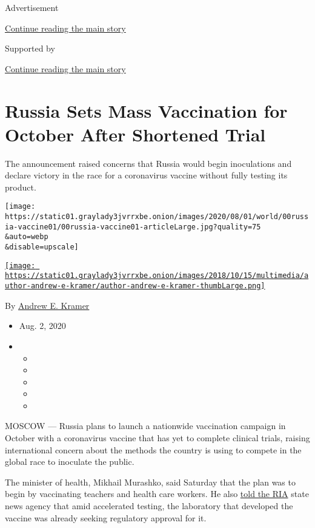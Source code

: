 Advertisement

\protect\hyperlink{after-top}{Continue reading the main story}

Supported by

\protect\hyperlink{after-sponsor}{Continue reading the main story}

\hypertarget{russia-sets-mass-vaccination-for-october-after-shortened-trial}{%
\section{Russia Sets Mass Vaccination for October After Shortened
Trial}\label{russia-sets-mass-vaccination-for-october-after-shortened-trial}}

The announcement raised concerns that Russia would begin inoculations
and declare victory in the race for a coronavirus vaccine without fully
testing its product.

\texttt{[image: https://static01.graylady3jvrrxbe.onion/images/2020/08/01/world/00russia-vaccine01/00russia-vaccine01-articleLarge.jpg?quality=75\\\&auto=webp\\\&disable=upscale]}

\href{https://www.nytimes3xbfgragh.onion/by/andrew-e-kramer}{\texttt{[image: https://static01.graylady3jvrrxbe.onion/images/2018/10/15/multimedia/author-andrew-e-kramer/author-andrew-e-kramer-thumbLarge.png]}}

By \href{https://www.nytimes3xbfgragh.onion/by/andrew-e-kramer}{Andrew
E. Kramer}

\begin{itemize}
\item
  Aug. 2, 2020
\item
  \begin{itemize}
  \item
  \item
  \item
  \item
  \item
  \end{itemize}
\end{itemize}

MOSCOW --- Russia plans to launch a nationwide vaccination campaign in
October with a coronavirus vaccine that has yet to complete clinical
trials, raising international concern about the methods the country is
using to compete in the global race to inoculate the public.

The minister of health, Mikhail Murashko, said Saturday that the plan
was to begin by vaccinating teachers and health care workers. He also
\href{https://ria.ru/20200801/1575248763.html}{told the RIA} state news
agency that amid accelerated testing, the laboratory that developed the
vaccine was already seeking regulatory approval for it.

